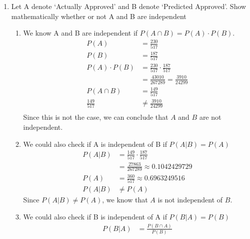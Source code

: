 \documentclass{article}
\begin{document}
\begin{enumerate}[label=\alph*)]
    \item Let A denote ‘Actually Approved’ and B denote ‘Predicted Approved’. Show
          mathematically whether or not A and B are independent
          \begin{enumerate}[label=Method \arabic*.]
              \item We know A and B are independent if \(P(A \cap B) = P(A) \cdot P(B)\).
                    \begin{align*}
                        P(A)            & = \frac{230}{517}                           \\
                        P(B)            & = \frac{187}{517}                           \\
                        P(A) \cdot P(B) & = \frac{230}{517} \cdot \frac{187}{517}     \\
                                        & = \frac{43010}{267289} = \frac{3910}{24299} \\
                        P(A \cap B)     & = \frac{149}{517}                           \\
                        \frac{149}{517} & \neq \frac{3910}{24299}                     \\
                    \end{align*}
                    Since this is not the case, we can conclude that \(A\) and \(B\) are not independent.
              \item We could also check if A is independent of B if \(P(A \vert B) = P(A)\)
                    \begin{align*}
                        P(A \vert B) & = \frac{149}{517} \cdot \frac{187}{517}     \\
                                     & = \frac{27863}{267289} \approx 0.1042429729 \\
                        P(A)         & = \frac{360}{517} \approx 0.6963249516      \\
                        P(A \vert B) & \neq P(A)
                    \end{align*}
                    Since \(P(A \vert B) \neq P(A)\), we know that \(A\) is not independent of \(B\).
              \item We could also check if B is independent of A if \(P(B \vert A) = P(B)\)
                    \begin{align*}
                        P(B \vert A)           & = \frac{P(B \cap A)}{P(B)}                             \\

\end{align*}
\end{enumerate}
\end{enumerate}
\end{document}
